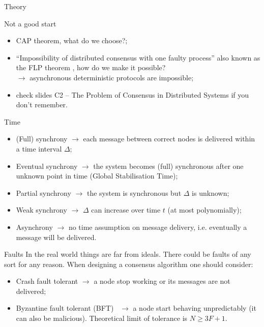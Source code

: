 \documentclass[presentation]{beamer}\mode<presentation>{\usetheme{AMSBolognaFC}}
\begin{document}
\begin{frame}[allowframebreaks]{Theory}
    \begin{block}{Not a good start}
    	\begin{itemize}
            \item CAP theorem, what do we choose?;
    		\item ``Impossibility of distributed consensus with one faulty process'' also known as the FLP theorem , how do we make it possible?\\
            $\rightarrow$ asynchronous deterministic protocols are impossible;
            \item check slides C2 -- The Problem of Consensus in Distributed Systems if you don't remember.
    	\end{itemize}
    \end{block}

    \framebreak

    \begin{block}{Time}
    	\begin{itemize}
    		\item (Full) synchrony $\rightarrow$ each message between correct nodes is delivered within a time interval $\Delta$;
            \item Eventual synchrony $\rightarrow$ the system becomes (full) synchronous after one unknown point in time (Global Stabilisation Time);
            \item Partial synchrony $\rightarrow$ the system is synchronous but $\Delta$ is unknown;
            \item Weak synchrony $\rightarrow$ $\Delta$ can increase over time $t$ (at most polynomially);
            \item Asynchrony $\rightarrow$ no time assumption on message delivery, i.e. eventually a message will be delivered.
    	\end{itemize}
    \end{block}

    \framebreak

    \begin{block}{Faults}
        In the real world things are far from ideals.
        There could be faults of any sort for any reason.
        When designing a consensus algorithm one should consider:
        \begin{itemize}
            \item \alert{Crash} fault tolerant $\rightarrow$ a node stop working or its messages are not delivered;
            \item \alert{Byzantine} fault tolerant (BFT)~ $\rightarrow$ a node start behaving unpredictably (it can also be malicious).
            Theoretical limit of tolerance is $N \ge 3F + 1$.
        \end{itemize}
    \end{block}


\end{frame}
\end{document}
